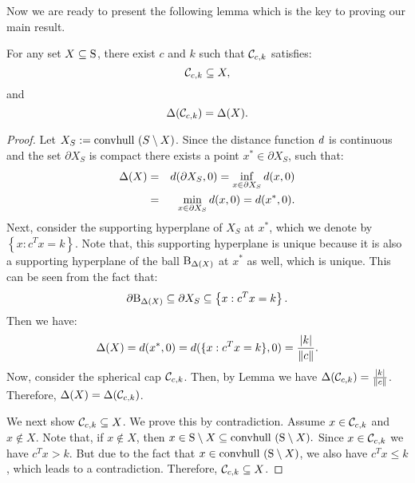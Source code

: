 Now we are ready to present the following lemma which is the key to proving our main result.
\begin{lemma}\label{lemma:constructSC}For any set $X \subseteq \text{S}$, there exist $c$ and $k$ such that $\mathcal{C}_{c,k}$ satisfies:
\begin{equation*}\mathcal{C}_{c,k} \subseteq X,
\end{equation*}
 and
\begin{equation}\Delta(\mathcal{C}_{c,k}) = \Delta(X).
\end{equation}
\end{lemma}

\begin{proof} Let $X_S := \mbox{convhull }(S \setminus X)$.
Since the distance function $d$ is continuous and the set $\partial X_S$ is compact there exists a point $x^* \in \partial X_S$, such that:
\begin{eqnarray}\nonumber \Delta(X) &=& d(\partial X_S, 0) = \inf_{x \in \partial X_S}d(x, 0) \\
\label{deltaSupporting}&=& \min_{x \in \partial X_S}d(x, 0) = d(x^*, 0).\end{eqnarray} 
Next, consider the supporting hyperplane of $X_S$ at $x^*$, which we denote by $\left\{x : c^Tx = k\right\}$. Note that, this supporting hyperplane is unique because it is also a supporting hyperplane of the ball $\text{B}_{\Delta(X)}$ at $x^*$ as well, which is unique. This can be seen from the fact that:
\begin{equation*} \partial \text{B}_{\Delta(X)} \subseteq \partial X_S \subseteq \left\{x : c^Tx = k\right\}.\end{equation*}
Then we have:
\begin{equation*}\Delta(X) =  d(x^*, 0) = d(\{x : c^Tx = k\}, 0) = \frac{|k|}{\|c\|}.
\end{equation*}
Now, consider the spherical cap $\mathcal{C}_{c,k}$. Then, by Lemma \label{lemma:delta2} we have
$\Delta(\mathcal{C}_{c,k}) = \frac{|k|}{\|c\|}$. Therefore, $\Delta(X) = \Delta(\mathcal{C}_{c,k})$.


We next show $\mathcal{C}_{c, k} \subseteq X$. We prove this by contradiction. Assume $x \in \mathcal{C}_{c,k}$ and $x \notin X$. Note that, if $x \notin X$, then $x \in \text{S} \setminus X \subseteq \mbox{convhull }(\text{S} \setminus X).$ Since $x \in \mathcal{C}_{c,k}$ we have $c^Tx>k$. But due to the fact that $x \in \mbox{convhull }(\text{S} \setminus X)$, we also have $c^Tx \leq k$, which leads to a contradiction. Therefore, $\mathcal{C}_{c, k} \subseteq X$. 
\end{proof}


